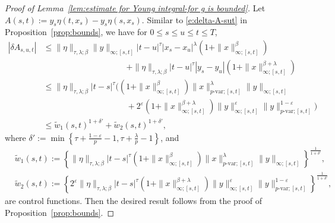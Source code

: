 \documentclass[11pt,reqno]{amsart}
\numberwithin{equation}{section}
\begin{document}
\begin{proof}[Proof of Lemma~\ref{lem:estimate for Young integral-for g is bounded}]
\makeatletter{}\makeatother
\label{proof:g(Y)}
Let  $A(s,t):= y_{s}\eta(t,x_{s}) - y_{s}\eta(s,x_{s}).$
Similar to \eqref{e:delta-A-sut} in Proposition~\ref{prop:bounds}, we have for  $0\le s\le u\le t\le T$,
\begin{equation*}
\begin{aligned}
\left|\delta A_{s,u,t}\right| &\le \|\eta\|_{\tau,\lambda;\beta} \|y\|_{\infty;[s,t]}|t-u|^{\tau} |x_{s} -x_{u}|^{\lambda}(1+\|x\|^{\beta}_{\infty;[s,t]})\\ 
&\qquad\qquad\qquad\qquad\qquad + \|\eta\|_{\tau,\lambda;\beta}|t-u|^{\tau}|y_s - y_u|(1+\|x\|^{\beta+\lambda}_{\infty;[s,t]})\\
&\le \|\eta\|_{\tau,\lambda;\beta} |t - s|^{\tau} \Big((1+\|x\|^{\beta}_{\infty;[s,t]})\|x\|^{\lambda}_{p\text{-var};[s,t]}\|y\|_{\infty;[s,t]}\\						&\qquad\qquad\qquad\qquad\qquad + 2^{\varepsilon}(1+\|x\|^{\beta+\lambda}_{\infty;[s,t]}) \|y\|^{\varepsilon}_{\infty;[s,t]}\|y\|^{1-\varepsilon}_{p\text{-var};[s,t]} \Big)\\
&\le \tilde{w}_1(s,t)^{1+\delta'} + \tilde{w}_2(s,t)^{1+\delta'},	
\end{aligned}
\end{equation*}
where $\delta' := \min\left\{\tau + \frac{1-\varepsilon}{p} - 1, \tau + \frac{\lambda}{p} - 1\right\}$, and 
\begin{equation*}
\begin{aligned}
&\tilde{w}_{1}(s,t):=\left\{\|\eta\|_{\tau,\lambda;\beta} |t - s|^{\tau}(1+\|x\|^{\beta}_{\infty;[s,t]})\|x\|^{\lambda}_{p\text{-var};[s,t]}\|y\|_{\infty;[s,t]}\right\}^{\frac{1}{1+\delta'}},\\
&\tilde{w}_{2}(s,t):=\left\{2^{\varepsilon}\|\eta\|_{\tau,\lambda;\beta} |t - s|^{\tau}(1+\|x\|^{\beta+\lambda}_{\infty;[s,t]}) \|y\|^{\varepsilon}_{\infty;[s,t]}\|y\|^{1 - \varepsilon}_{p\text{-var};[s,t]}\right\}^{\frac{1}{1+\delta'}},
\end{aligned}
\end{equation*}
are control functions.  Then the desired result follows from the proof of Proposition~\ref{prop:bounds}.
\end{proof}
\end{document}
